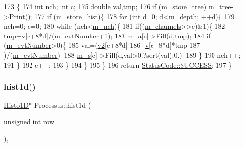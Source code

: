 \begin{DoxyCode}
173                                    \{
174   \textcolor{keywordtype}{int} nch; \textcolor{keywordtype}{int} c;
175   \textcolor{keywordtype}{double} val,tmp;
176   \textcolor{keywordflow}{if} (\hyperlink{classAcquisition_aca2143e9135e25554e58327475a767c5}{m\_store\_tree}) \hyperlink{classAcquisition_a70f10db9c972f22a60bd2b82750168da}{m\_tree}->Print();
177   \textcolor{keywordflow}{if} (\hyperlink{classAcquisition_a08f70edd83751dbdab4c8190dc4b9188}{m\_store\_hist})\{
178     \textcolor{keywordflow}{for} (\textcolor{keywordtype}{int} d=0; d<\hyperlink{classAcquisition_a26628424533a2dd74d24712a14637a72}{m\_depth}; ++d)\{
179       nch=0; c=0;
180       \textcolor{keywordflow}{while} (nch<\hyperlink{classAcquisition_a1860c7a03a65ea7a778d30dd4a40e1e1}{m\_nch})\{
181         \textcolor{keywordflow}{if}((\hyperlink{classAcquisition_aedc8b29f322ef00540797fbd0d5112d1}{m\_channels}>>c)&1)\{
182           tmp=\hyperlink{classAcquisition_a8f0ef9898c1e63fb6f13c14508d3180d}{v}[c+8*d]/(\hyperlink{classAcquisition_a32a70daa3f653eae5eafc46dbd0e11a6}{m\_evtNumber}+1);
183           \hyperlink{classAcquisition_a88963f722bfcde824882f6312a44e825}{m\_a}[c]->Fill(d,tmp);
184           \textcolor{keywordflow}{if} (\hyperlink{classAcquisition_a32a70daa3f653eae5eafc46dbd0e11a6}{m\_evtNumber}>0)\{
185             val=(\hyperlink{classAcquisition_a841316dcf4f210ad52b144b187f2b7b6}{v2}[c+8*d]
186                  -\hyperlink{classAcquisition_a8f0ef9898c1e63fb6f13c14508d3180d}{v}[c+8*d]*tmp
187                  )/(\hyperlink{classAcquisition_a32a70daa3f653eae5eafc46dbd0e11a6}{m\_evtNumber});
188             \hyperlink{classAcquisition_a15d71455f658e21a12ef4c153c21df65}{m\_s}[c]->Fill(d,val>0.?sqrt(val):0.);
189           \}
190           nch++;
191         \}
192         c++;
193       \}
194     \}
195   \}
196   \textcolor{keywordflow}{return} \hyperlink{classStatusCode_a6f565cbeadc76d14c72f047e5e85eb4badd0da38d3ba0d922efd1f4619bc37ad8}{StatusCode::SUCCESS};
197 \}
\end{DoxyCode}
\mbox{\label{classProcessus_a409227db936baff03c0462c1bcfe8069}} 
\subsubsection{\texorpdfstring{hist1d()}{hist1d()}}
{\footnotesize\ttfamily \hyperlink{classHisto1D}{Histo1D}$\ast$ Processus\+::hist1d (\begin{DoxyParamCaption}\item[{unsigned int}]{row }\end{DoxyParamCaption})\hspace{0.3cm}{\ttfamily [inline]}, {\ttfamily [inherited]}}

